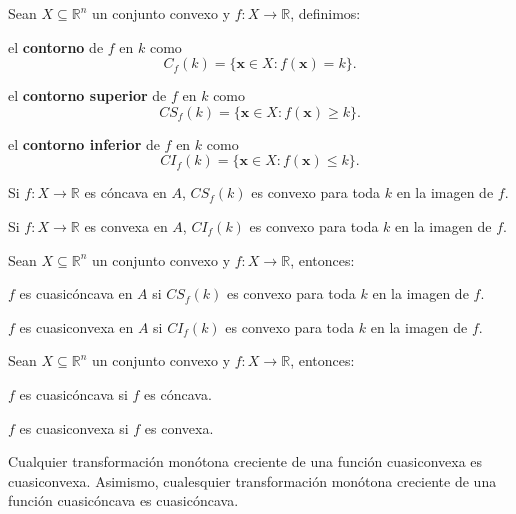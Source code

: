 \documentclass[8pt,a4paper]{extarticle}
\begin{document}
\begin{multicols}{3}
\begin{boxdef}
	Sean $X \subseteq \mathbb{R}^n$ un conjunto convexo y $f : X \to \mathbb{R}$, definimos:
	\begin{bulletlist}
	\item el \textbf{contorno} de $f$ en $k$ como $$C_f(k) = \{\mathbf{x} \in X : f(\mathbf{x}) = k\}.$$
	\item el \textbf{contorno superior} de $f$ en $k$ como $$CS_f(k) = \{\mathbf{x} \in X : f(\mathbf{x}) \ge k\}.$$
	\item el \textbf{contorno inferior} de $f$ en $k$ como $$CI_f(k) = \{\mathbf{x} \in X : f(\mathbf{x}) \le k\}.$$
	\end{bulletlist}
\end{boxdef}

\begin{boxtheo}[]
	\begin{eqlist}
	\item Si $f : X \to \mathbb{R}$ es cóncava en $A$, $CS_f(k)$ es convexo para toda $k$ en la imagen de $f$.
	\item Si $f : X \to \mathbb{R}$ es convexa en $A$, $CI_f(k)$ es convexo para toda $k$ en la imagen de $f$.
	\end{eqlist}
\end{boxtheo}

\begin{boxtheo}[]
	Sean $X \subseteq \mathbb{R}^n$ un conjunto convexo y $f : X \to \mathbb{R}$, entonces:
	\begin{eqlist}
	\item $f$ es cuasicóncava en $A$ si $CS_f (k)$ es convexo para toda $k$ en la imagen de $f$.
	\item $f$ es cuasiconvexa en $A$ si $CI_f (k)$ es convexo para toda $k$ en la imagen de $f$.
	\end{eqlist}
\end{boxtheo}

\begin{boxtheo}[]
	Sean $X \subseteq \mathbb{R}^n$ un conjunto convexo y $f : X \to \mathbb{R}$, entonces:
	\begin{eqlist}
	\item $f$ es cuasicóncava si $f$ es cóncava.
	\item $f$ es cuasiconvexa si $f$ es convexa.
	\end{eqlist}
\end{boxtheo}

\begin{boxtheo}[]
	Cualquier transformación monótona creciente de una función cuasiconvexa es cuasiconvexa. Asimismo, cualesquier transformación monótona creciente de una función cuasicóncava es cuasicóncava.
\end{boxtheo}


\end{multicols}
\end{document}
